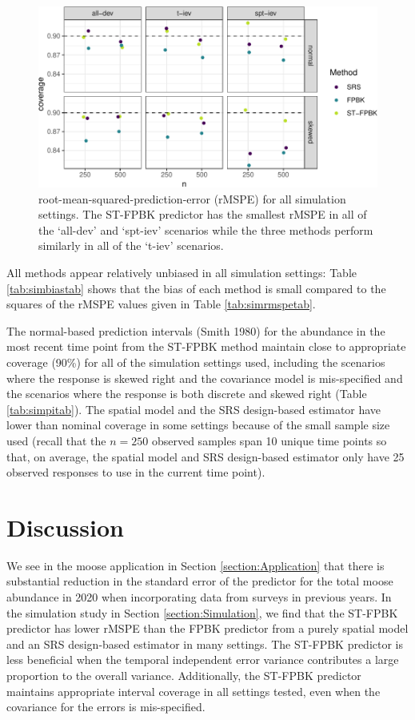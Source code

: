 \documentclass[smallextended]{svjour3}       %
\begin{document}
\begin{figure}
\centering
\includegraphics{preprint_springer_files/figure-latex/unnamed-chunk-19-1.pdf}
\caption{\label{fig:rmspe} root-mean-squared-prediction-error (rMSPE)
for all simulation settings. The ST-FPBK predictor has the smallest
rMSPE in all of the `all-dev' and `spt-iev' scenarios while the three
methods perform similarly in all of the `t-iev' scenarios.}
\end{figure}

All methods appear relatively unbiased in all simulation settings: Table
\ref{tab:simbiastab} shows that the bias of each method is small
compared to the squares of the rMSPE values given in Table
\ref{tab:simrmspetab}.

The normal-based prediction intervals (Smith 1980) for the abundance in
the most recent time point from the ST-FPBK method maintain close to
appropriate coverage (90\%) for all of the simulation settings used,
including the scenarios where the response is skewed right and the
covariance model is mis-specified and the scenarios where the response
is both discrete and skewed right (Table \ref{tab:simpitab}). The
spatial model and the SRS design-based estimator have lower than nominal
coverage in some settings because of the small sample size used (recall
that the \(n = 250\) observed samples span 10 unique time points so
that, on average, the spatial model and SRS design-based estimator only
have 25 observed responses to use in the current time point).

\hypertarget{section:Discussion}{%
\section{Discussion}\label{section:Discussion}}

We see in the moose application in Section \ref{section:Application}
that there is substantial reduction in the standard error of the
predictor for the total moose abundance in 2020 when incorporating data
from surveys in previous years. In the simulation study in Section
\ref{section:Simulation}, we find that the ST-FPBK predictor has lower
rMSPE than the FPBK predictor from a purely spatial model and an SRS
design-based estimator in many settings. The ST-FPBK predictor is less
beneficial when the temporal independent error variance contributes a
large proportion to the overall variance. Additionally, the ST-FPBK
predictor maintains appropriate interval coverage in all settings
tested, even when the covariance for the errors is mis-specified.
\end{document}
